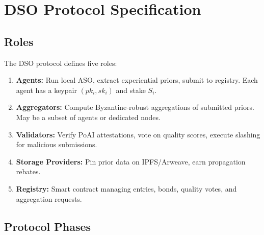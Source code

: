 \section{DSO Protocol Specification}

\label{sec:protocol}

\subsection{Roles}

The DSO protocol defines five roles:

\begin{enumerate}[leftmargin=1.5em]
    \item \textbf{Agents:} Run local ASO, extract experiential priors, submit
          to registry. Each agent has a keypair $(pk_i, sk_i)$ and stake $S_i$.
    \item \textbf{Aggregators:} Compute Byzantine-robust aggregations of
          submitted priors. May be a subset of agents or dedicated nodes.
    \item \textbf{Validators:} Verify PoAI attestations, vote on quality scores,
          execute slashing for malicious submissions.
    \item \textbf{Storage Providers:} Pin prior data on IPFS/Arweave, earn
          propagation rebates.
    \item \textbf{Registry:} Smart contract managing entries, bonds, quality
          votes, and aggregation requests.
\end{enumerate}

\subsection{Protocol Phases}

